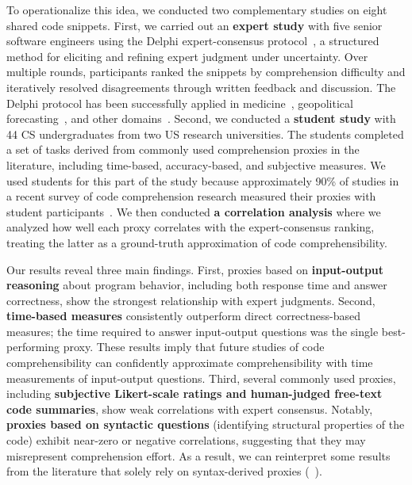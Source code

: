 To operationalize this idea, we conducted two complementary studies on eight shared code snippets. First, we carried out an \textbf{expert study} with five senior software engineers using the Delphi expert-consensus protocol~\cite{delphi,delphiOriginal,randManual}, a structured method for eliciting and refining expert judgment under uncertainty. Over multiple rounds, participants ranked the snippets by comprehension difficulty and iteratively resolved disagreements through written feedback and discussion. The Delphi protocol has been successfully applied in medicine~\cite{m1,m2,m3,m4}, geopolitical forecasting~\cite{g1,g2}, and other domains~\cite{e1,o1}. 
Second, we conducted a \textbf{student study} with 44 CS undergraduates from two US research universities. The students completed a set of tasks derived from commonly used comprehension proxies in the literature, including time-based, accuracy-based, and subjective measures. 
We used students for this part of the study because approximately 90\% of studies in a recent survey of code comprehension research measured their proxies with student participants~\cite{Wyrich:ACS23}.
We then conducted \textbf{a correlation analysis} where we analyzed how well each proxy correlates with the expert-consensus ranking, treating the latter as a ground-truth approximation of code comprehensibility.


Our results reveal three main findings. First,  proxies based on \textbf{input-output reasoning} about program behavior, including both response time and answer correctness,  show the strongest relationship with expert judgments. Second, \textbf{time-based measures} consistently outperform direct correctness-based measures; the time required to answer input-output questions was the single best-performing proxy.
These results imply that future studies of code comprehensibility can confidently approximate comprehensibility with time measurements of input-output questions.
Third, several commonly used proxies, including \textbf{subjective Likert-scale ratings and human-judged free-text code summaries}, show weak correlations with expert consensus. Notably, \textbf{proxies based on syntactic questions} (\eg identifying structural properties of the code) exhibit near-zero or negative correlations, suggesting that they may misrepresent comprehension effort.
As a result, we can reinterpret some results from the literature that solely rely on syntax-derived proxies (\eg~\cite{33-4,33-29}).


